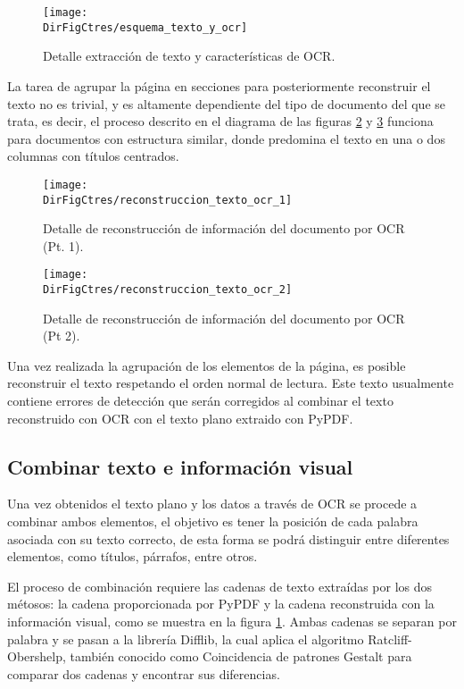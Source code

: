 \begin{figure}[]
    \centering
    \texttt{[image: \\DirFigCtres/esquema\_texto\_y\_ocr]}
    \caption{Detalle extracción de texto y características de OCR.}
    \label{fig:texto_y_ocr}
\end{figure}

La tarea de agrupar la página en secciones para posteriormente reconstruir el texto
no es trivial, y es altamente dependiente del tipo de documento del
que se trata, es decir, el proceso descrito en el diagrama de las figuras
\ref{fig:reconstruccion_texto_1} y \ref{fig:reconstruccion_texto_2} funciona para
documentos con estructura similar, donde predomina el texto en una o dos
columnas con títulos centrados.

\begin{figure}[]
    \centering
    \texttt{[image: \\DirFigCtres/reconstruccion\_texto\_ocr\_1]}
    \caption{Detalle de reconstrucción de información del documento por OCR (Pt. 1).}
    \label{fig:reconstruccion_texto_1}
\end{figure}

\begin{figure}[]
    \centering
    \texttt{[image: \\DirFigCtres/reconstruccion\_texto\_ocr\_2]}
    \caption{Detalle de reconstrucción de información del documento por OCR (Pt 2).}
    \label{fig:reconstruccion_texto_2}
\end{figure}

Una vez realizada la agrupación de los elementos de la página, es posible reconstruir
el texto respetando el orden normal de lectura. Este texto usualmente contiene
errores de detección que serán corregidos al combinar el texto reconstruido
con OCR con el texto plano extraido con PyPDF.

\subsection{Combinar texto e información visual}

Una vez obtenidos el texto plano y los datos a través de OCR se procede a combinar ambos
elementos, el objetivo es tener la posición de cada palabra asociada con su texto correcto,
de esta forma se podrá distinguir entre diferentes elementos, como títulos, párrafos,
entre otros.

El proceso de combinación requiere las cadenas de texto extraídas por los dos métosos:
la cadena proporcionada por PyPDF y la cadena reconstruida con la información
visual, como se muestra en la figura \ref{fig:texto_y_ocr}. Ambas cadenas se
separan por palabra y se pasan a la librería Difflib, la cual aplica el algoritmo
Ratcliff-Obershelp, también conocido como Coincidencia de patrones Gestalt para
comparar dos cadenas y encontrar sus diferencias.

